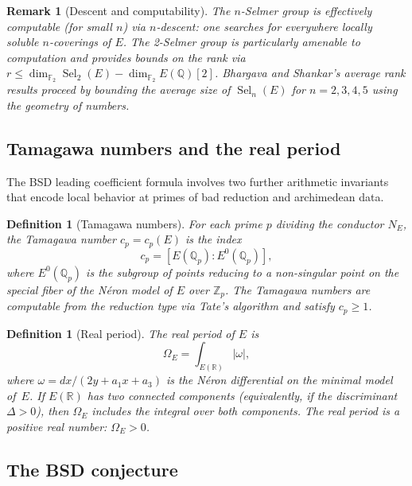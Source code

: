 \documentclass[11pt]{article}
\newtheorem{definition}[theorem]{Definition}
\newtheorem{remark}[theorem]{Remark}
\DeclareMathOperator{\Sel}{Sel}
\begin{document}
\begin{remark}[Descent and computability]
The $n$-Selmer group is effectively computable (for small $n$) via
$n$-descent: one searches for everywhere locally soluble $n$-coverings of $E$.
The 2-Selmer group is particularly amenable to computation and provides
bounds on the rank via $r \leq \dim_{\mathbb{F}_2} \Sel_2(E) -
\dim_{\mathbb{F}_2} E(\mathbb{Q})[2]$.  Bhargava and Shankar's
average rank results \cite{BS} proceed by bounding the average size of
$\Sel_n(E)$ for $n = 2, 3, 4, 5$ using the geometry of numbers.
\end{remark}

\subsection{Tamagawa numbers and the real period}
\label{subsec:tamagawa}

The BSD leading coefficient formula involves two further arithmetic invariants
that encode local behavior at primes of bad reduction and archimedean data.

\begin{definition}[Tamagawa numbers]
For each prime $p$ dividing the conductor $N_E$, the \emph{Tamagawa number}
$c_p = c_p(E)$ is the index
\[
  c_p = [E(\mathbb{Q}_p) : E^0(\mathbb{Q}_p)],
\]
where $E^0(\mathbb{Q}_p)$ is the subgroup of points reducing to a non-singular
point on the special fiber of the N\'eron model of $E$ over $\mathbb{Z}_p$.
The Tamagawa numbers are computable from the reduction type via Tate's
algorithm \cite{Tate-algo} and satisfy $c_p \geq 1$.
\end{definition}

\begin{definition}[Real period]
The \emph{real period} of $E$ is
\[
  \Omega_E = \int_{E(\mathbb{R})} |\omega|,
\]
where $\omega = dx/(2y + a_1 x + a_3)$ is the N\'eron differential on the
minimal model of~$E$.  If $E(\mathbb{R})$ has two connected components
(equivalently, if the discriminant $\Delta > 0$), then $\Omega_E$ includes the
integral over both components.  The real period is a positive real number:
$\Omega_E > 0$.
\end{definition}

\subsection{The BSD conjecture}
\end{document}

